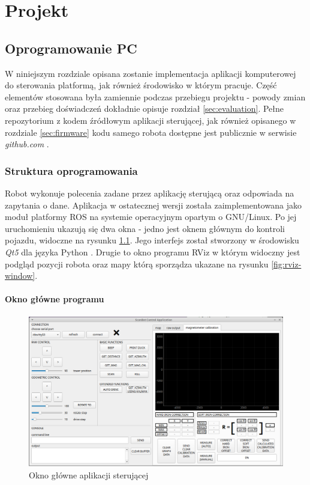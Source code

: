 \chapter{Projekt}
\section{Oprogramowanie PC}
W niniejszym rozdziale opisana zostanie implementacja aplikacji komputerowej do sterowania platformą, jak również środowisko w którym pracuje. Część elementów stosowana była zamiennie podczas przebiegu projektu - powody zmian oraz przebieg doświadczeń dokładnie opisuje rozdział \ref{sec:evaluation}. Pełne repozytorium z kodem źródłowym aplikacji sterującej, jak również opisanego w rozdziale \ref{sec:firmware} kodu samego robota dostępne jest publicznie w serwisie \emph{github.com} \cite{scanbot-repo}.

\label{sec:pc-software}
\subsection{Struktura oprogramowania}

Robot wykonuje polecenia zadane przez aplikację sterującą oraz odpowiada na zapytania o dane. Aplikacja w ostatecznej wersji została zaimplementowana jako moduł platformy ROS\cite{ros} na systemie operacyjnym opartym o GNU/Linux. Po jej uruchomieniu ukazują się dwa okna - jedno jest oknem głównym do kontroli pojazdu, widoczne na rysunku \ref{fig:app-main-window}. Jego interfejs został stworzony w środowisku \emph{Qt5} dla języka Python \cite{qtforpython}. Drugie to okno programu RViz w którym widoczny jest podgląd pozycji robota oraz mapy którą sporządza ukazane na rysunku \ref{fig:rviz-window}.

\subsubsection{Okno główne programu}
\begin{figure}[ht]
	\centering
		\includegraphics[width=1\linewidth]{rys/main-app-view-3.PNG}
	\caption{Okno główne aplikacji sterującej}
	\label{fig:app-main-window}
\end{figure}

